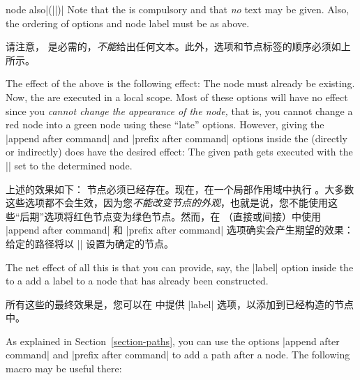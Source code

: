 \begin{pathoperation}{node also}{|(||)|}
    Note that the  is compulsory and that \emph{no} text may be
    given. Also, the ordering of options and node label must be as above.

    请注意， 是必需的，\emph{不能}给出任何文本。此外，选项和节点标签的顺序必须如上所示。



    The effect of the above is the following effect: The node  must
    already  be existing. Now, the  are executed in a local
    scope. Most of these options will have no effect since you \emph{cannot
    change the appearance of the node,} that is, you cannot change a red node
    into a green node using these ``late'' options. However, giving the
    |append after command| and |prefix after command| options inside the
     (directly or indirectly) does have the desired effect:
    The given path gets executed with the |\tikzlastnode| set to the determined
    node.

    上述的效果如下： 节点必须已经存在。现在，在一个局部作用域中执行 。大多数这些选项都不会生效，因为您\emph{不能改变节点的外观}，也就是说，您不能使用这些“后期”选项将红色节点变为绿色节点。然而，在 （直接或间接）中使用 |append after command| 和 |prefix after command| 选项确实会产生期望的效果：给定的路径将以 |\tikzlastnode| 设置为确定的节点。



    The net effect of all this is that you can provide, say, the |label| option
    inside the  to a add a label to a node that has already been
    constructed.
    
    所有这些的最终效果是，您可以在  中提供 |label| 选项，以添加到已经构造的节点中。


\begin{codeexample}[]
\end{codeexample}
\end{pathoperation}

As explained in Section~\ref{section-paths}, you can use the options
|append after command| and |prefix after command| to add a path after a node.
The following macro may be useful there:

